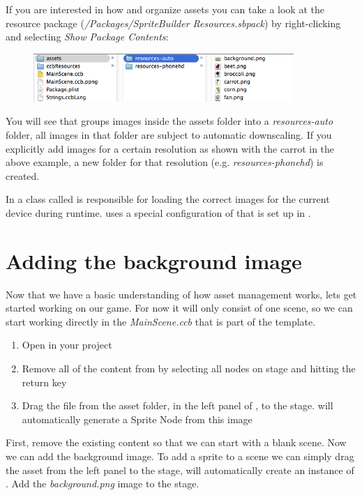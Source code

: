 \begin{details} 
If you are interested in how \SB{} and \cocos{} organize assets you can take a
look at the resource package
(\textit{/Packages/\allowbreak{}SpriteBuilder Resources\allowbreak{}.sbpack}) by
right-clicking and selecting \textit{Show Package Contents}:
\begin{figure}[H]
		\centering
		\includegraphics[width=280pt]{images/Chapter2/behindscenes_resourcepack.png}
\end{figure}
You will see that \SB{} groups images inside the assets folder into a
\textit{resources-auto} folder, all images in that folder are subject to
automatic downscaling. If you explicitly add images for a certain resolution as
shown with the carrot in the above example, a new folder for that resolution
(e.g. \textit{resources-phonehd}) is created.

In \cocos{} a class called  is responsible for loading
the correct images for the current device during runtime. \SB{} uses a special
configuration of  that is set up in
. 
\end{details}

\section{Adding the background image}
Now that we have a basic understanding of how asset management works, lets get
started working on our game. For now it will only consist of one scene, so
we can start working directly in the \textit{MainScene.ccb} that is part of the
\SB{} template. 

\begin{leftbar}
\begin{enumerate}
  \item Open  in your \SB{} project
  \item Remove all of the content from  by selecting
  all nodes on stage and hitting the return key
  \item Drag the  file from the asset folder, in the
  left panel of \SB{}, to the stage. \SB{} will automatically generate a Sprite
  Node from this image
\end{enumerate}
First, remove the existing content so that we can start with a blank
scene. Now we can add the background image. To add a sprite to a scene we can
simply drag the asset from the left panel to the stage, \SB{} will
automatically create an instance of \ccsprite{}. Add the \textit{background.png} image to the stage.
\end{leftbar}

